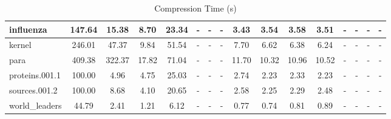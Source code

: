 \begin{table}[]
\begin{tabular}{|l|c|c|c|c|c|c|c|c|c|c|c|c|c|c|c|}
\hline
influenza & 147.64 & 15.38 & 8.70 & 23.34 & - & - & - & 3.43 & 3.54 & 3.58 & 3.51 & - & - & - & - \\
\hline
kernel & 246.01 & 47.37 & 9.84 & 51.54 & - & - & - & 7.70 & 6.62 & 6.38 & 6.24 & - & - & - & - \\
\hline
para & 409.38 & 322.37 & 17.82 & 71.04 & - & - & - & 11.70 & 10.32 & 10.96 & 10.52 & - & - & - & - \\
\hline
proteins.001.1 & 100.00 & 4.96 & 4.75 & 25.03 & - & - & - & 2.74 & 2.23 & 2.33 & 2.23 & - & - & - & - \\
\hline
sources.001.2 & 100.00 & 8.68 & 4.10 & 20.65 & - & - & - & 2.58 & 2.25 & 2.29 & 2.48 & - & - & - & - \\
\hline
world\_leaders & 44.79 & 2.41 & 1.21 & 6.12 & - & - & - & 0.77 & 0.74 & 0.81 & 0.89 & - & - & - & - \\
\hline
\end{tabular}
\caption{Compression Time (s)}
\label{tab:compression_time}
\end{table}
